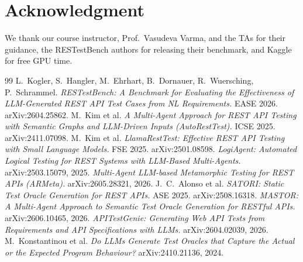 \documentclass[11pt,a4paper]{article}
\begin{document}
\section*{Acknowledgment}
We thank our course instructor, Prof.~Vasudeva Varma, and the TAs for their guidance, the RESTestBench authors for releasing their benchmark, and Kaggle for free GPU time.

\begin{thebibliography}{99}\small
\setlength{\itemsep}{1pt}
 L.~Kogler, S.~Hangler, M.~Ehrhart, B.~Dornauer, R.~Wuersching, P.~Schrammel. \emph{RESTestBench: A Benchmark for Evaluating the Effectiveness of LLM-Generated REST API Test Cases from NL Requirements.} EASE 2026. arXiv:2604.25862.
 M.~Kim et al. \emph{A Multi-Agent Approach for REST API Testing with Semantic Graphs and LLM-Driven Inputs (AutoRestTest).} ICSE 2025. arXiv:2411.07098.
 M.~Kim et al. \emph{LlamaRestTest: Effective REST API Testing with Small Language Models.} FSE 2025. arXiv:2501.08598.
 \emph{LogiAgent: Automated Logical Testing for REST Systems with LLM-Based Multi-Agents.} arXiv:2503.15079, 2025.
 \emph{Multi-Agent LLM-based Metamorphic Testing for REST APIs (ARMeta).} arXiv:2605.28321, 2026.
 J.~C.~Alonso et al. \emph{SATORI: Static Test Oracle Generation for REST APIs.} ASE 2025. arXiv:2508.16318.
 \emph{MASTOR: A Multi-Agent Approach to Semantic Test Oracle Generation for RESTful APIs.} arXiv:2606.10465, 2026.
 \emph{APITestGenie: Generating Web API Tests from Requirements and API Specifications with LLMs.} arXiv:2604.02039, 2026.
 M.~Konstantinou et al. \emph{Do LLMs Generate Test Oracles that Capture the Actual or the Expected Program Behaviour?} arXiv:2410.21136, 2024.
\end{thebibliography}
\end{document}
